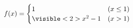 \documentclass{beamer}
\begin{document}
\begin{frame}

\[
f(x) = \begin{cases}
1        & (x \leq 1) \\
\visible<2>{x^2 - 1}  & (x > 1)
\end{cases}
\]

\end{frame}
\end{document}
